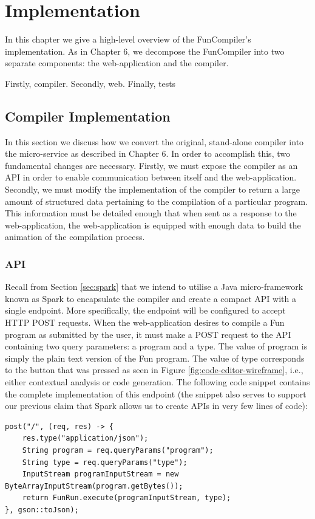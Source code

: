\documentclass{l4proj}
\begin{document}
\chapter{Implementation}
In this chapter we give a high-level overview of the FunCompiler's implementation. As in Chapter 6, we decompose the FunCompiler into two separate components: the web-application and the compiler. 

Firstly, compiler. Secondly, web. Finally, tests

\section{Compiler Implementation}
In this section we discuss how we convert the original, stand-alone compiler into the micro-service as described in Chapter 6.  In order to accomplish this, two fundamental changes are necessary. Firstly, we must expose the compiler as an API in order to enable communication between itself and the web-application. Secondly, we must modify the implementation of the compiler to return a large amount of structured data pertaining to the compilation of a particular program. This information must be detailed enough that when sent as a response to the web-application, the web-application is equipped with enough data to build the animation of the compilation process.

\subsection{API}
Recall from Section \ref{sec:spark} that we intend to utilise a Java micro-framework known as Spark to encapsulate the compiler and create a compact API with a single endpoint. More specifically, the endpoint will be configured to accept HTTP POST requests. When the web-application desires to compile a Fun program as submitted by the user, it must make a POST request to the API  containing two query parameters: a program and a type. The value of program is simply the plain text version of the Fun program. The value of type corresponds to the button that was pressed as seen in Figure \ref{fig:code-editor-wireframe}, i.e., either contextual analysis or code generation. The following code snippet contains the complete implementation of this endpoint (the snippet also serves to support our previous claim that Spark allows us to create APIs in very few lines of code):
\begin{lstlisting}
post("/", (req, res) -> {
	res.type("application/json");
	String program = req.queryParams("program");
 	String type = req.queryParams("type");
	InputStream programInputStream = new ByteArrayInputStream(program.getBytes());
	return FunRun.execute(programInputStream, type);
}, gson::toJson);
\end{lstlisting} 
\end{document}
